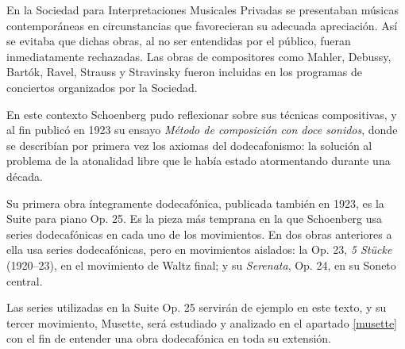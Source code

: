 		En la Sociedad para Interpretaciones Musicales Privadas se presentaban m\'usicas contempor\'aneas en circunstancias que favorecieran su adecuada apreciaci\'on. As\'i se evitaba que dichas obras, al no ser entendidas por el p\'ublico, fueran inmediatamente rechazadas. Las obras de compositores como Mahler, Debussy, Bart\'ok, Ravel, Strauss y Stravinsky fueron incluidas en los programas de conciertos organizados por la Sociedad.
		
		En este contexto Schoenberg pudo reflexionar sobre sus t\'ecnicas compositivas, y al fin public\'o en 1923 su ensayo \emph{M\'etodo de composici\'on con doce sonidos}, donde se describ\'ian por primera vez los axiomas del dodecafonismo: la soluci\'on al problema de la atonalidad libre que le hab\'ia estado atormentando durante una d\'ecada.
		
		Su primera obra \'integramente dodecaf\'onica, publicada tambi\'en en 1923, es la Suite para piano Op. 25. Es la pieza m\'as temprana en la que Schoenberg usa series dodecaf\'onicas en cada uno de los movimientos. En dos obras anteriores a ella usa series dodecaf\'onicas, pero en movimientos aislados: la Op. 23, \emph{5 St\"ucke} (1920--23), en el movimiento de Waltz final; y su \emph{Serenata}, Op. 24, en su Soneto central.
		
		Las series utilizadas en la Suite Op. 25 servir\'an de ejemplo en este texto, y su tercer movimiento, Musette, ser\'a estudiado y analizado en el apartado \ref{musette} con el fin de entender una obra dodecaf\'onica en toda su extensi\'on.